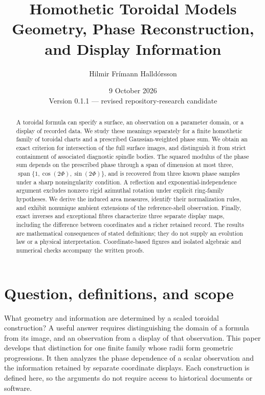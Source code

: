 \documentclass[11pt,a4paper]{article}
\title{\textbf{Homothetic Toroidal Models}\\[3pt]
Geometry, Phase Reconstruction, and Display Information}
\author{Hilmir Frímann Halldórsson}
\date{9 October 2026\\[3pt]\small Version 0.1.1 --- revised repository-research candidate}
\theoremstyle{definition}
\theoremstyle{remark}
\begin{document}
\maketitle
\begin{abstract}
A toroidal formula can specify a surface, an observation on a parameter
domain, or a display of recorded data. We study these meanings separately
for a finite homothetic family of toroidal charts and a prescribed
Gaussian-weighted phase sum. We obtain an exact criterion for intersection
of the full surface images, and distinguish it from strict containment of
associated diagnostic spindle bodies. The squared modulus of the phase
sum depends on the prescribed phase through a span of dimension at most
three, $\operatorname{span}\{1,\cos(2\Phi),\sin(2\Phi)\}$, and is
recovered from three known phase samples under a sharp nonsingularity
condition. A reflection and
exponential-independence argument excludes nonzero rigid azimuthal
rotation under explicit ring-family hypotheses. We derive the induced
area measures, identify their normalization rules, and exhibit
nonunique ambient extensions of the reference-shell observation.
Finally, exact inverses and exceptional fibres characterize three
separate display maps, including the difference between coordinates and
a richer retained record. The results are mathematical consequences of
stated definitions; they do not supply an evolution law or a physical
interpretation. Coordinate-based figures and isolated algebraic and
numerical checks accompany the written proofs.
\end{abstract}

\section{Question, definitions, and scope}
\label{sec:intro}
What geometry and information are determined by a scaled toroidal
construction? A useful answer requires distinguishing the domain of a
formula from its image, and an observation from a display of that
observation. This paper develops that distinction for one finite family
whose radii form geometric progressions. It then analyzes the phase
dependence of a scalar observation and the information retained by
separate coordinate displays. Each construction is defined here, so the
arguments do not require access to historical documents or software.
\end{document}
